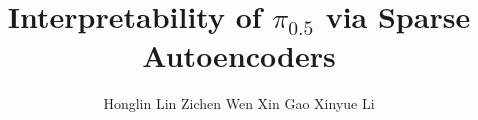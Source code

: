\documentclass{article}
\title{Interpretability of $\pi_{0.5}$ via Sparse Autoencoders}
\author{%
  Honglin Lin \quad Zichen Wen \quad Xin Gao \quad Xinyue Li
}
\begin{document}
\maketitle

\begin{abstract}

\end{abstract}







\clearpage



\appendix

\end{document}
